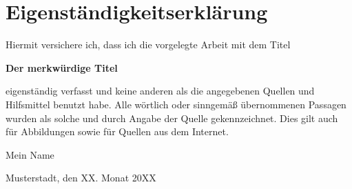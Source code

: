 
\section{Eigenständigkeitserklärung}
\label{sec:app_eigenst}

\vspace{20mm}

Hiermit versichere ich, dass ich die vorgelegte Arbeit mit dem Titel

\vspace{5mm}
\textbf{Der merkwürdige Titel}
\vspace{5mm}

eigenständig verfasst und keine anderen als die angegebenen Quellen und Hilfsmittel benutzt habe. Alle wörtlich oder sinngemäß übernommenen Passagen wurden als solche und durch Angabe der Quelle gekennzeichnet. Dies gilt auch für Abbildungen sowie für Quellen aus dem Internet.

\vspace{40mm}

\begin{flushright}
Mein Name

\vspace{5mm}

Musterstadt, den XX. Monat 20XX
\end{flushright}
